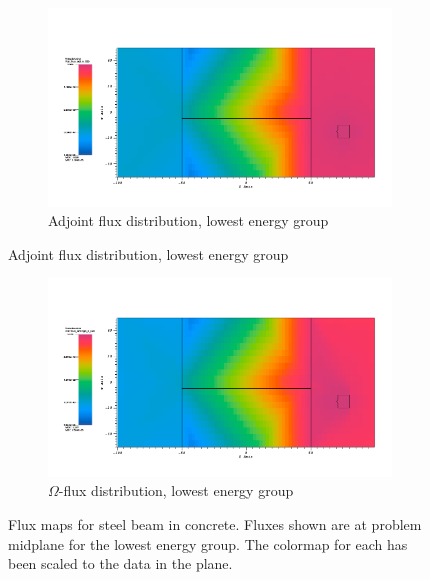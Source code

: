 \begin{figure}[htb!]
  \centering
  \begin{subfigure}[t]{\textwidth}
    \includegraphics[width=0.9\linewidth]{./chapters/characterization_probs/figures/char/prob_1/prob1adjG26.png}
    \caption{Adjoint flux distribution, lowest energy group}
    \label{fig:steelbeamadj}
  \end{subfigure}
\end{figure}
\begin{figure}[htb!]\ContinuedFloat
  \centering
  \begin{subfigure}[t]{\textwidth}
    \includegraphics[width=0.9\linewidth]{./chapters/characterization_probs/figures/char/prob_1/prob1omegaG26.png}
    \caption{$\Omega$-flux distribution, lowest energy group}
    \label{fig:steelbeamomega}
  \end{subfigure}
  \caption[Flux maps for steel beam in concrete.]{Flux maps for steel beam in
  concrete. Fluxes shown are at problem midplane for the lowest energy group. The
  colormap for each has been scaled to the data in the plane.}
  \label{fig:steelbeamfluxes}
\end{figure}

